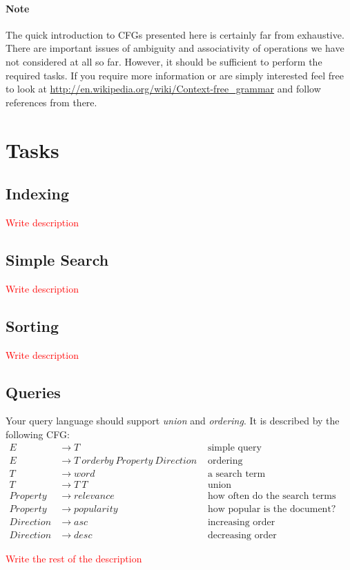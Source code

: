 \documentclass[11pt]{article}
\newcommand{\TODOP}[1]{\par\textcolor{red}{#1}\marginpar{\textcolor{red}{TODO}}}
\begin{document}
\paragraph{Note} The quick introduction to CFGs presented here is certainly far from exhaustive. There are important issues of ambiguity and associativity of operations we have not considered at all so far. However, it should be sufficient to perform the required tasks. If you require more information or are simply interested feel free to look at \url{http://en.wikipedia.org/wiki/Context-free_grammar} and follow references from there.

\section{Tasks}

\subsection{Indexing}
\TODOP{Write description}

\subsection{Simple Search}
\TODOP{Write description}

\subsection{Sorting}
\TODOP{Write description}

\subsection{Queries}
Your query language should support \emph{union} and \emph{ordering}. It is described by the following CFG:
\begin{align*}
E &\to T &\mbox{ simple query}\\
E &\to T \ orderby \ Property \ Direction &\mbox{ ordering}\\
T &\to word &\mbox{ a search term} \\
T &\to T \ T &\mbox{ union} \\
Property &\to relevance &\mbox{ how often do the search terms appear in a document?}\\
Property &\to popularity &\mbox{ how popular is the document?}\\
Direction &\to asc &\mbox{ increasing order}\\
Direction &\to desc &\mbox{ decreasing order}
\end{align*}
\TODOP{Write the rest of the description}
\end{document}
